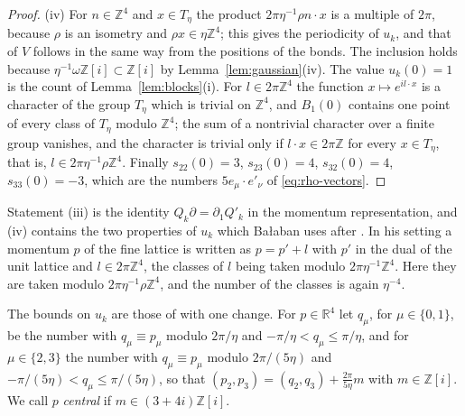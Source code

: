 \documentclass[11pt]{preprint}
\numberwithin{equation}{section}
\theoremstyle{definition}
\theoremstyle{remark}
\theoremstyle{plain}
\begin{document}
\begin{proof}
(iv) For $n \in \mathbb Z^4$ and $x \in T_\eta$ the product $2\pi\eta^{-1}\rho n \cdot x$ is a multiple of $2\pi$, because $\rho$ is an isometry and $\rho x \in \eta\mathbb Z^4$; this gives the periodicity of $u_k$, and that of $V$ follows in the same way from the positions of the bonds. The inclusion holds because $\eta^{-1}\omega\mathbb Z[i] \subset \mathbb Z[i]$ by Lemma~\ref{lem:gaussian}(iv). The value $u_k(0) = 1$ is the count of Lemma~\ref{lem:blocks}(i). For $l \in 2\pi\mathbb Z^4$ the function $x \mapsto e^{il \cdot x}$ is a character of the group $T_\eta$ which is trivial on $\mathbb Z^4$, and $B_1(0)$ contains one point of every class of $T_\eta$ modulo $\mathbb Z^4$; the sum of a nontrivial character over a finite group vanishes, and the character is trivial only if $l \cdot x \in 2\pi\mathbb Z$ for every $x \in T_\eta$, that is, $l \in 2\pi\eta^{-1}\rho\mathbb Z^4$. Finally $s_{22}(0) = 3$, $s_{23}(0) = 4$, $s_{32}(0) = 4$, $s_{33}(0) = -3$, which are the numbers $5e_\mu \cdot e'_\nu$ of \eqref{eq:rho-vectors}.
\end{proof}

Statement (iii) is the identity $Q_k\partial = \partial_1Q'_k$ in the momentum representation, and (iv) contains the two properties of $u_k$ which Ba{\l}aban uses after \cite[(1.33), p.~23]{BalabanPRT1}. In his setting a momentum $p$ of the fine lattice is written as $p = p' + l$ with $p'$ in the dual of the unit lattice and $l \in 2\pi\mathbb Z^4$, the classes of $l$ being taken modulo $2\pi\eta^{-1}\mathbb Z^4$. Here they are taken modulo $2\pi\eta^{-1}\rho\mathbb Z^4$, and the number of the classes is again $\eta^{-4}$.

The bounds on $u_k$ are those of \cite[(1.36), p.~24]{BalabanPRT1} with one change. For $p \in \mathbb R^4$ let $q_\mu$, for $\mu \in \{ 0, 1 \}$, be the number with $q_\mu \equiv p_\mu$ modulo $2\pi/\eta$ and $-\pi/\eta < q_\mu \leq \pi/\eta$, and for $\mu \in \{ 2, 3 \}$ the number with $q_\mu \equiv p_\mu$ modulo $2\pi/(5\eta)$ and $-\pi/(5\eta) < q_\mu \leq \pi/(5\eta)$, so that $(p_2, p_3) = (q_2, q_3) + \frac{2\pi}{5\eta}m$ with $m \in \mathbb Z[i]$. We call $p$ \emph{central} if $m \in (3 + 4i)\mathbb Z[i]$.
\end{document}
